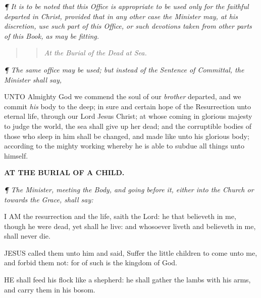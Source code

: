\emph{¶
It is to be noted that this Office is appropriate to be used only for
the faithful departed in Christ, provided that in any other case the
Minister may, at his discretion, use such part of this Office, or such
devotions taken from other parts of this Book, as may be fitting.}

\begin{quote}

\begin{quote}

\emph{At
the Burial of the Dead at Sea.}

\end{quote}

\end{quote}

\emph{¶
The same office may be used; but instead of the Sentence of Committal,
the Minister shall say,}

UNTO
Almighty God we commend the soul of our \emph{brother} departed, and
we commit \emph{his} body to the deep; in sure and certain hope of the
Resurrection unto eternal life, through our Lord Jesus Christ; at whose
coming in glorious majesty to judge the world, the sea shall give up her
dead; and the corruptible bodies of those who sleep in him shall be changed,
and made like unto his glorious body; according to the mighty working
whereby he is able to subdue all things unto himself.

\begin{quote}

\begin{quote}

\end{quote}

\end{quote}

\emph{}
\textbf{AT
THE BURIAL OF A CHILD.}

\emph{¶
The Minister, meeting the Body, and going before it, either into the Church
or towards the Grace, shall say:}

I
AM the resurrection and the life, saith the Lord: he that believeth in
me, though he were dead, yet shall he live: and whosoever liveth and believeth
in me, shall never die.

JESUS
called them unto him and said, Suffer the little children to come unto
me, and forbid them not: for of such is the kingdom of God.

HE
shall feed his flock like a shepherd: he shall gather the lambs with his
arms, and carry them in his bosom.


